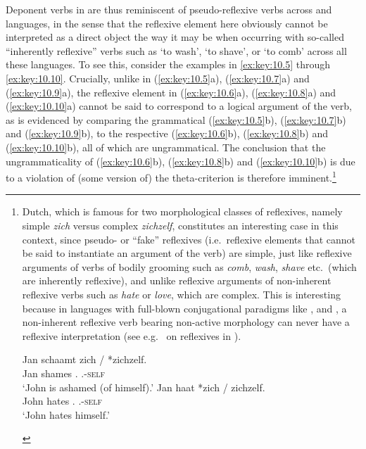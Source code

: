 \documentclass[output=paper]{langsci/langscibook}
\begin{document}
Deponent verbs in  are thus reminiscent of pseudo-reflexive verbs
across  and  languages, in the sense that the reflexive element
here obviously cannot be interpreted as a direct object the way it may be when
occurring with so-called “inherently reflexive” verbs such as ‘to wash’, ‘to
shave’, or ‘to comb’ across all these languages. To see this, consider the
examples in \eqref{ex:key:10.5} through \eqref{ex:key:10.10}. Crucially, unlike in
(\ref{ex:key:10.5}a), (\ref{ex:key:10.7}a) and (\ref{ex:key:10.9}a), the reflexive element in
(\ref{ex:key:10.6}a), (\ref{ex:key:10.8}a) and (\ref{ex:key:10.10}a) cannot be said to
correspond to a logical argument of the verb, as is evidenced by comparing the
grammatical (\ref{ex:key:10.5}b), (\ref{ex:key:10.7}b) and (\ref{ex:key:10.9}b), to the
respective (\ref{ex:key:10.6}b), (\ref{ex:key:10.8}b) and (\ref{ex:key:10.10}b), all of which
are ungrammatical. The conclusion that the ungrammaticality of (\ref{ex:key:10.6}b),
(\ref{ex:key:10.8}b) and (\ref{ex:key:10.10}b) is due to a violation of (some version of)
the theta-criterion is therefore imminent.\footnote{Dutch, which is famous for
two morphological classes of reflexives, namely simple \emph{zich} versus
complex \emph{zichzelf}, constitutes an interesting case in this context, since
pseudo- or \enquote{fake} reflexives (i.e.\ reflexive elements that cannot be
said to instantiate an argument of the verb) are simple, just like reflexive
arguments of verbs of bodily grooming such as \emph{comb}, \emph{wash},
\emph{shave} etc.\ (which are inherently reflexive), and unlike reflexive
arguments of non-inherent reflexive verbs such as \emph{hate} or \emph{love},
which are complex. This is interesting because in languages with full-blown
conjugational paradigms like ,  and , a non-inherent
reflexive verb bearing non-active morphology can never have a reflexive
interpretation (see e.g.\ \citealt{Embick1997,Embick:2004b} on reflexives in
).

\begin{exe}
     
    \sn
    \gll    Jan schaamt zich / *zichzelf.\\
            Jan shames \Refl.\Third{} {} \hphantom{*}\Refl.\Third-\textsc{self}\\
    \glt    \enquote*{John is ashamed (of himself).}
     
    \sn
    \gll    Jan haat *zich / zichzelf.\\
            John hates \llap{*}\Refl.\Third{} {} \Refl.\Third{}-\textsc{self}\\
    \glt    \enquote*{John hates himself.}
\end{exe}}
\end{document}
